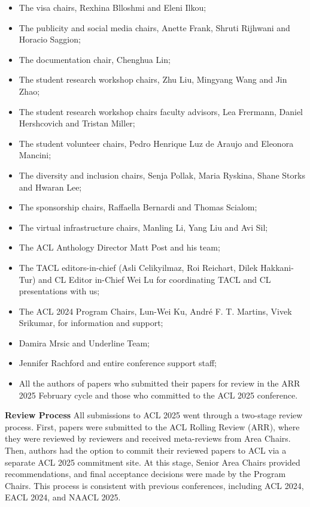 \begin{itemize}
\item The visa chairs, Rexhina Blloshmi and Eleni Ilkou;
\item The publicity and social media chairs, Anette Frank, Shruti Rijhwani and Horacio Saggion;
\item The documentation chair, Chenghua Lin;
\item The student research workshop chairs, Zhu Liu, Mingyang Wang and Jin Zhao;
\item The student research workshop chairs faculty advisors, Lea Frermann, Daniel Hershcovich               
and Tristan Miller;
\item The student volunteer chairs, Pedro Henrique Luz de Araujo and Eleonora Mancini;
\item The diversity and inclusion chairs, Senja Pollak, Maria Ryskina, Shane Storks and Hwaran Lee;
\item The sponsorship chairs, Raffaella Bernardi and Thomas Scialom;
\item The virtual infrastructure chairs, Manling Li, Yang Liu and Avi Sil;
\item The ACL Anthology Director Matt Post and his team;
\item The TACL editors-in-chief (Asli Celikyilmaz, Roi Reichart, Dilek Hakkani-Tur) and CL Editor in-Chief Wei Lu for coordinating TACL and CL presentations with us;
\item The ACL 2024 Program Chairs, Lun-Wei Ku, André F. T. Martins, Vivek Srikumar, for information and support;
\item Damira Mrsic and Underline Team; 
\item Jennifer Rachford and entire conference support staff; 
\item All the authors of papers who submitted their papers for review in the ARR 2025 February cycle and those who committed to the ACL 2025 conference.
\end{itemize}

\textbf{Review Process}
All submissions to ACL 2025 went through a two-stage review process. First, papers were submitted to the ACL Rolling Review (ARR), where they were reviewed by reviewers and received meta-reviews from Area Chairs. Then, authors had the option to commit their reviewed papers to ACL via a separate ACL 2025 commitment site. At this stage, Senior Area Chairs provided recommendations, and final acceptance decisions were made by the Program Chairs. This process is consistent with previous conferences, including ACL 2024, EACL 2024, and NAACL 2025.

